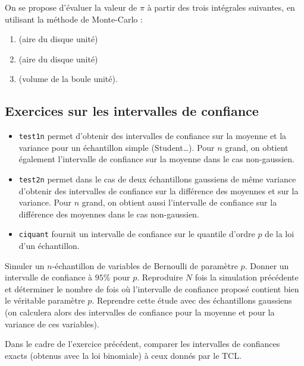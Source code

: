 \begin{example}
  On se propose d'évaluer la valeur de $\pi$ à partir des trois intégrales
  suivantes, en utilisant la méthode de Monte-Carlo :
\begin{enumerate}
\item {} \quad (aire du disque unité)
\item {} \quad (aire du disque unité)
\item {} \quad (volume de la boule
  unité).
\end{enumerate}
%
%
%
\end{example}

\subsection{Exercices sur les intervalles de confiance}

\begin{itemize}
\item \texttt{test1n} permet d'obtenir des intervalles de confiance sur la
  moyenne et la variance pour un échantillon simple (Student\ldots). Pour $n$
  grand, on obtient également l'intervalle de confiance sur la moyenne dans le
  cas non-gaussien.
\item \texttt{test2n} permet dans le cas de deux échantillons gaussiens de
  même variance d'obtenir des intervalles de confiance sur la différence des
  moyennes et sur la variance. Pour $n$ grand, on obtient aussi l'intervalle
  de confiance sur la différence des moyennes dans le cas non-gaussien.
\item \texttt{ciquant} fournit un intervalle de confiance sur le quantile
  d'ordre $p$ de la loi d'un échantillon.
\end{itemize}

\begin{exo}
  Simuler un $n$-échantillon de variables de Bernoulli de paramètre $p$.
  Donner un intervalle de confiance à $95\%$ pour $p$. Reproduire $N$ fois la
  simulation précédente et déterminer le nombre de fois où l'intervalle de
  confiance proposé contient bien le véritable paramètre $p$. Reprendre cette
  étude avec des échantillons gaussiens (on calculera alors des intervalles de
  confiance pour la moyenne et pour la variance de ces variables).
\end{exo}

\begin{exo}
  Dans le cadre de l'exercice précédent, comparer les intervalles de
  confiances exacts (obtenus avec la loi binomiale) à ceux donnés par le TCL.
\end{exo}

